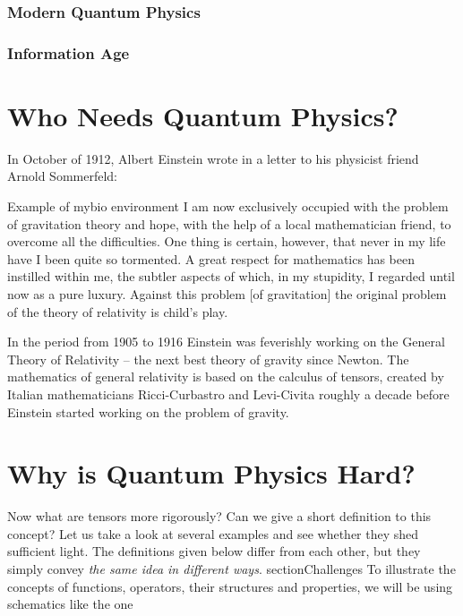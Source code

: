 \subsubsection*{Modern Quantum Physics}

\subsubsection*{Information Age}


\section{Who Needs Quantum Physics?}

In October of 1912, Albert Einstein wrote in a letter to his physicist
friend Arnold Sommerfeld:
\begin{mybio}{Example of mybio environment}
  I am now exclusively occupied with the problem of gravitation theory
and hope, with the help of a local mathematician friend, to overcome
all the difficulties. One thing is certain, however, that never in my
life have I been quite so tormented. A great respect for mathematics
has been instilled within me, the subtler aspects of which, in my stupidity,
I regarded until now as a pure luxury. Against this problem [of
  gravitation] the original problem of the theory of relativity is
child’s play.
\end{mybio}
In the period from 1905 to 1916 Einstein was feverishly working on the
General Theory of Relativity -- the next
best theory of gravity since
Newton. The mathematics of general relativity is based on the calculus
of tensors, created by Italian mathematicians Ricci-Curbastro and
Levi-Civita roughly a decade before Einstein started working on the
problem of gravity.


\section{Why is Quantum Physics Hard?}\label{sec:ExampleDefinitions}
Now what are tensors more rigorously? Can we give a short definition
to this concept?
Let us take a look at several examples and see whether they shed
sufficient light. The definitions given below differ from each other,
but they simply convey \emph{the same idea in different ways}.
section{Challenges}
To illustrate the concepts of functions, operators, their structures and
properties, we will be using schematics like the one

